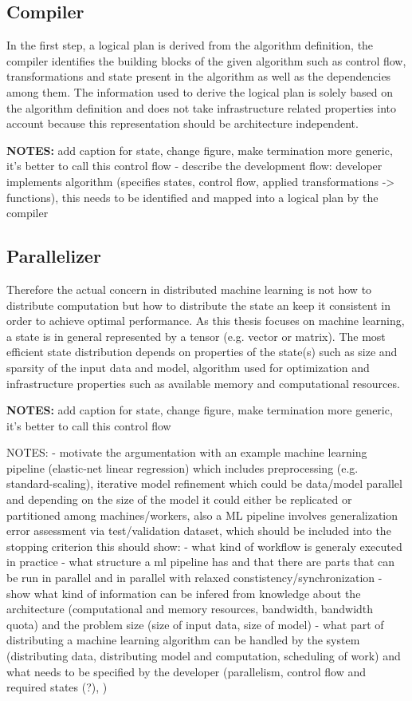 \subsection{Compiler}
In the first step, a logical plan is derived from the algorithm definition, the compiler identifies the building blocks of the given algorithm such as control flow, transformations and state present in the algorithm as well as the dependencies among them.
The information used to derive the logical plan is solely based on the algorithm definition and does not take infrastructure related properties into account because this representation should be architecture independent.




\textbf{NOTES:} add caption for state, change figure, make termination more generic, it's better to call this control flow
- describe the development flow: developer implements algorithm (specifies states, control flow, applied transformations -> functions), this needs to be identified and mapped into a logical plan by the compiler

\subsection{Parallelizer}
Therefore the actual concern in distributed machine learning is not how to distribute computation but how to distribute the state an keep it consistent in order to achieve optimal performance.
As this thesis focuses on machine learning, a state is in general represented by a tensor (e.g. vector or matrix).
The most efficient state distribution depends on properties of the state(s) such as size and sparsity of the input data and model, algorithm used for optimization and infrastructure properties such as available memory and computational resources.

\textbf{NOTES:} add caption for state, change figure, make termination more generic, it's better to call this control flow

NOTES:
- motivate the argumentation with an example machine learning pipeline (elastic-net linear regression) which includes preprocessing (e.g. standard-scaling), iterative model refinement which could be data/model parallel and depending on the size of the model it could either be replicated or partitioned among machines/workers, also a ML pipeline involves generalization error assessment via test/validation dataset, which should be included into the stopping criterion
this should show:
	- what kind of workflow is generaly executed in practice
	- what structure a ml pipeline has and that there are parts that can be run in parallel and in parallel with relaxed constistency/synchronization
	- show what kind of information can be infered from knowledge about the architecture (computational and memory resources, bandwidth, bandwidth quota) and the problem size (size of input data, size of model)
	- what part of distributing a machine learning algorithm can be handled by the system (distributing data, distributing model and computation, scheduling of work) and what needs to be specified by the developer (parallelism, control flow and required states (?), )


